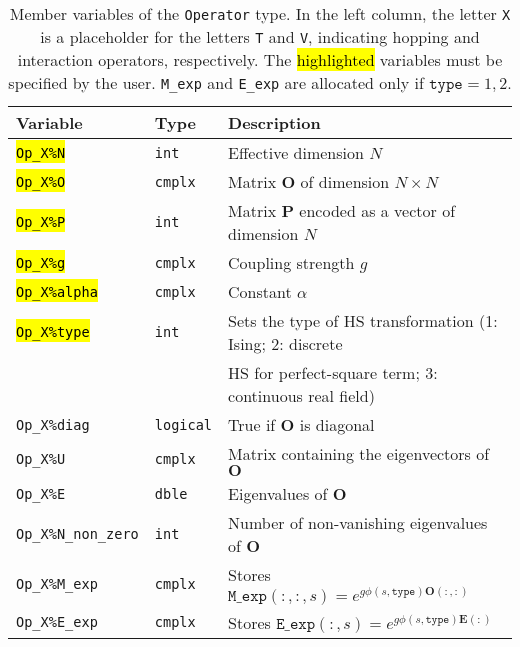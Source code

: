 \begin{table}[h!]
	\begin{center}
    \begin{tabular}{@{} l l l @{}}\toprule
    Variable & Type & Description \\\midrule
    \hl{\texttt{Op\_X\%N}}       & \texttt{int}     &  Effective dimension $N$ \\
    \hl{\texttt{Op\_X\%O}}       & \texttt{cmplx}   &  Matrix  $\bm{O}$  of dimension $N \times N$\\
    \hl{\texttt{Op\_X\%P}}       & \texttt{int}     &  Matrix $\bm{P}$  encoded as a vector of dimension $N$\\
    \hl{\texttt{Op\_X\%g}}       & \texttt{cmplx}   &  Coupling strength $g$ \\  
    \hl{\texttt{Op\_X\%alpha}}   & \texttt{cmplx}   &  Constant $\alpha$ \\
    \hl{\texttt{Op\_X\%type}}    & \texttt{int}     &  Sets the type of HS transformation (1: Ising; 2: discrete\\
             &   &    HS for perfect-square term; 3: continuous real field)  \\ 
    \texttt{Op\_X\%diag}         & \texttt{logical} &  True if   $\bm{O}$  is  diagonal  \\
    \texttt{Op\_X\%U}            & \texttt{cmplx}   &  Matrix containing the eigenvectors of $\bm{O}$  \\
    \texttt{Op\_X\%E}            & \texttt{dble}    &  Eigenvalues of $\bm{O}$ \\
    \texttt{Op\_X\%N\_non\_zero} & \texttt{int}     &  Number of non-vanishing eigenvalues of $\bm{O}$  \\
    \texttt{Op\_X\%M\_exp}       & \texttt{cmplx}   &  Stores $ \texttt{M\_exp}(:,:,s) = e^{g  \phi(s,\texttt{type}) \bm{O}(:,:)} $  \\
    \texttt{Op\_X\%E\_exp}       & \texttt{cmplx}   &  Stores $ \texttt{E\_exp}(:,s) = e^{g  \phi(s,\texttt{type}) \bm{E}(:)} $ 
     \\\bottomrule
   \end{tabular}
   \caption{Member variables of the \texttt{Operator}  type. 
   In the left column, the letter \texttt{X} is a placeholder for the letters \texttt{T} and \texttt{V}, 
   indicating hopping and interaction operators, respectively.
   The \hl{highlighted} variables must be specified by the user. \texttt{M\_exp} and \texttt{E\_exp}  are allocated only if  $\texttt{type}=1,2$. 
    \label{table:operator}}
\end{center}
\end{table}
%



